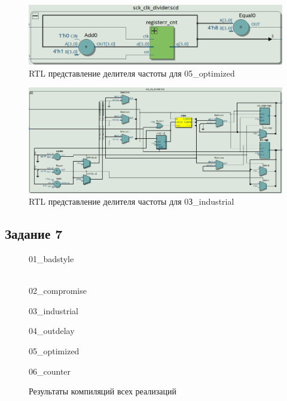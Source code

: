 \documentclass[a4paper,14pt]{article}
\begin{document}
	\begin{figure}[H]
		\centering
		\includegraphics[width=0.7\linewidth]{images/z6_trl_clk_div}
		\caption{RTL представление делителя частоты для 05\_optimized}
		\label{fig:z6trlclkdiv}
	\end{figure}

	\begin{figure}[H]
		\centering
		\includegraphics[width=0.7\linewidth]{images/z1_5_rtl_clk_divider}
		\caption{RTL представление делителя частоты для 0З\_industrial}
		\label{fig:z15rtlclkdivider1}
	\end{figure}
	
	\subsection{Задание 7}
	
	\begin{figure}[H]
		\begin{minipage}[h]{0.4\linewidth}
			 01\_badstyle \\
		\end{minipage}
		\hfill
		\begin{minipage}[h]{0.4\linewidth}
			 \\02\_compromise
		\end{minipage}
		\vfill
		\begin{minipage}[h]{0.4\linewidth}
			 03\_industrial \\
		\end{minipage}
		\hfill
		\begin{minipage}[h]{0.4\linewidth}
			 04\_outdelay \\
		\end{minipage}
		\vfill
		\begin{minipage}[h]{0.4\linewidth}
			 05\_optimized \\
		\end{minipage}
		\hfill
		\begin{minipage}[h]{0.4\linewidth}
			 06\_counter \\
		\end{minipage}
		\caption{Результаты компиляций всех реализаций}
		\label{fig:compilations}
	\end{figure}
	
\end{document}

